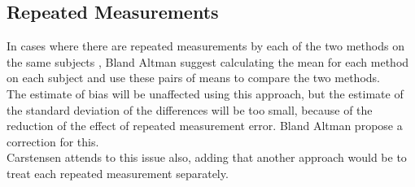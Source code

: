 \documentclass[12pt, a4paper]{report}
\begin{document}
\subsection{Repeated Measurements }
In cases where there are repeated measurements by each of the two
methods on the same subjects , Bland Altman suggest calculating
the mean for each method on each subject and use these pairs of
means to compare the two methods.
\\
The estimate of bias will be unaffected using this approach, but
the estimate of the standard deviation of the differences will be
too small, because of the reduction of the effect of repeated
measurement error. Bland Altman propose a correction for this.
\\
Carstensen attends to this issue also, adding that another
approach would be to treat each repeated measurement separately.
\end{document}

